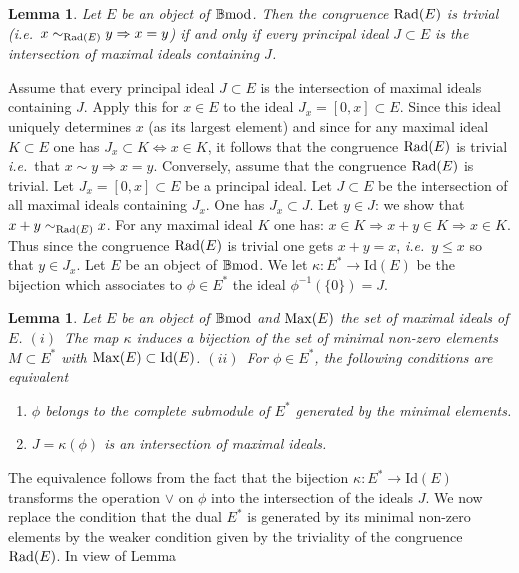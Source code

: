 \documentclass[12pt]{article}
\newtheorem{lem}[thm]{Lemma}
\def\id{{\rm id}}
\def\rad{{\rm Rad}}
\def\B{{\mathbb B}}
\newcommand{\ie}{{\it i.e.\/}\ }
\def\id{{\mbox{Id}}}
\def\bmod{{\rm \B mod}}
\begin{document}
\begin{lem}\label{lem radical1} 
Let  $E$ be an object of $\bmod$. Then the congruence $\rad(E)$ is trivial (\ie  $x\sim_{\rad(E)} y\Rightarrow x=y$) if and only if every principal ideal $J\subset E$ is the intersection of maximal ideals containing $J$.
\end{lem}
\proof  Assume that every principal ideal $J\subset E$ is the intersection of maximal ideals containing $J$. Apply this for $x\in E$ to the ideal $J_x=[0,x]\subset E$. Since this ideal uniquely determines $x$ (as its largest element) and since for any maximal ideal $K\subset E$ one has $J_x\subset K\iff x\in K$, it follows that the congruence $\rad(E)$ is trivial \ie that $x\sim y\Rightarrow x=y$. Conversely, assume that the congruence $\rad(E)$ is trivial. Let $J_x=[0,x]\subset E$ be a principal ideal. Let $J\subset E$ be the intersection of all maximal ideals containing $J_x$. One has $J_x\subset J$. Let $y\in J$: we show that $x+y\sim_{\rad(E)} x$.  For any maximal ideal $K$ one has: $
x\in K\Rightarrow x+y\in K \Rightarrow x\in K
$.
Thus since the congruence $\rad(E)$ is trivial one gets $x+y=x$, \ie $y\leq x$ so that $y\in J_x$. \endproof
Let  $E$ be an object of $\bmod$.  We let $\kappa:E^*\to \id(E)$ be the bijection which associates to $\phi\in E^*$  the ideal $\phi^{-1}(\{0\})=J$.
\begin{lem}\label{linear forms prep} Let $E$ be an object of $\bmod$ and ${\rm Max}(E)$ the set of maximal ideals of $E$. \newline
$(i)$~The map $\kappa$ induces a bijection of the set of minimal non-zero elements $M\subset E^*$ with ${\rm Max}(E)\subset \id(E)$. \newline
  $(ii)$~For $\phi\in E^*$, the following conditions are equivalent
   \begin{enumerate}       
   \item $\phi$ belongs to the complete submodule of $E^*$ generated by the minimal elements.
    \item $J=\kappa(\phi)$ is an intersection of maximal ideals.  	
   \end{enumerate} 	
   \end{lem}
   \proof The equivalence follows from the fact that the bijection $\kappa:E^*\to \id(E)$   transforms the operation $\vee$ on $\phi$ into the intersection of the ideals $J$.\endproof 
 We now replace the condition that the dual $E^*$ is generated by its minimal non-zero elements by the weaker condition given by  the triviality of the congruence $\rad(E)$. In view of Lemma 
\end{document}
